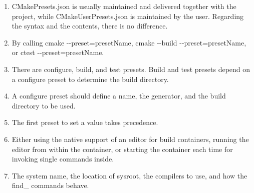 

\begin{enumerate}
\item 
CMakePresets.json is usually maintained and delivered together with the project, while CMakeUserPresets.json is maintained by the user. Regarding the syntax and the contents, there is no difference.

\item
By calling cmake -{}-preset=presetName, cmake -{}-build -{}-preset=presetName, or ctest -{}-preset=presetName.

\item 
There are configure, build, and test presets. Build and test presets depend on a configure preset to determine the build directory.

\item 
A configure preset should define a name, the generator, and the build directory to be used.

\item 
The first preset to set a value takes precedence.

\item 
Either using the native support of an editor for build containers, running the editor from within the container, or starting the container each time for invoking single commands inside.

\item 
The system name, the location of sysroot, the compilers to use, and how the find\_ commands behave.
\end{enumerate}